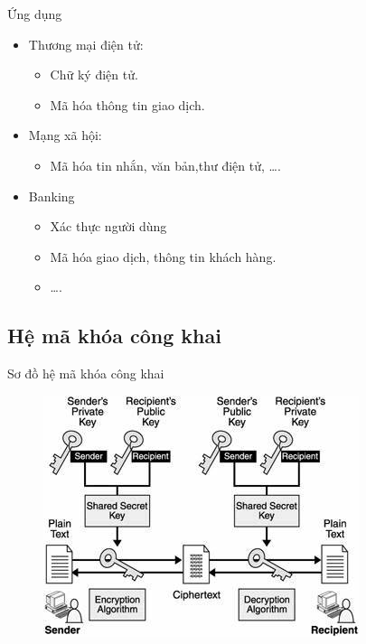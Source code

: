 \documentclass[compress]{beamer}
\begin{document}
\begin{frame}{Ứng dụng}
\begin{itemize}
\item Thương mại điện tử:
\begin{itemize}
\item Chữ ký điện tử.
\item Mã hóa thông tin giao dịch.
\end{itemize}
\item Mạng xã hội:
\begin{itemize}
\item Mã hóa tin nhắn, văn bản,thư điện tử, \ldots .
\end{itemize}
\item Banking
\begin{itemize}
\item Xác thực người dùng
\item Mã hóa giao dịch, thông tin khách hàng.
\item \ldots.
\end{itemize}
\end{itemize}
\end{frame}
\subsection{Hệ mã khóa công khai}
\begin{frame}{Sơ đồ hệ mã khóa công khai}
\begin{center}
\begin{figure}[H]
\centering
\includegraphics[width=0.65\linewidth]{../3.jpg}
\end{figure}
\end{center}
\end{frame}
\end{document}
